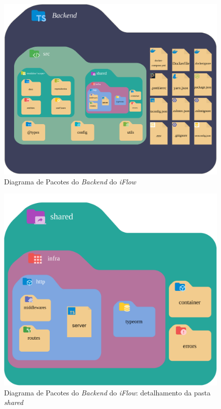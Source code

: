 \begin{figure}[]
    \begin{center}
        \caption{{Diagrama de Pacotes do \textit{Backend} do \textit{iFlow}}}
        \label{fig:pacotes_backend}
        \includegraphics[scale=0.9]{figuras/Proposta/Diagrama_de_Pacotes-Backend.png}
    \end{center}
\end{figure}

\begin{figure}[]
    \begin{center}
        \caption{{Diagrama de Pacotes do \textit{Backend} do \textit{iFlow}: detalhamento da pasta \textit{shared}}}
        \label{fig:pacotes_backend_shared}
        \includegraphics[scale=0.7]{figuras/Proposta/Diagrama_de_Pacotes-Backend_shared.png}
    \end{center}
\end{figure}

